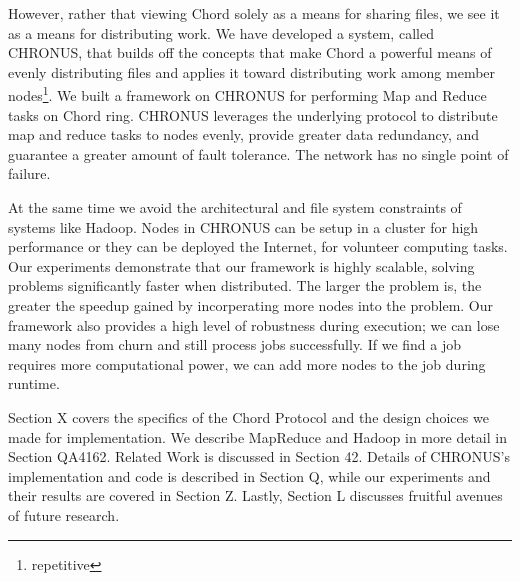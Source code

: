 \documentclass[conference, compsocconf, letterpaper]{IEEEtran}
\begin{document}
However, rather that viewing Chord solely as a means for sharing files, we see it as a means for distributing work.  We have developed a system, called CHRONUS, that builds off the concepts that make Chord a powerful means of evenly distributing files and applies it toward distributing work among member nodes\footnote{repetitive}.  We built a framework on CHRONUS for performing Map and Reduce tasks on Chord ring.  CHRONUS leverages the underlying protocol to distribute map and reduce tasks to nodes evenly, provide greater data redundancy, and guarantee a greater amount of fault tolerance.  The network has no single point of failure.

At the same time we avoid the architectural and file system constraints of systems like Hadoop.  Nodes in CHRONUS can be setup in a cluster for high performance or they can be deployed the Internet, for volunteer computing tasks.  Our experiments demonstrate that our framework is highly scalable, solving problems significantly faster when distributed.  The larger the problem is, the greater the speedup gained by incorperating more nodes into the problem.  Our framework also provides a high level of robustness during execution;  we can lose many nodes from churn and still process jobs successfully.  If we find a job requires more computational power, we can add more nodes to the job  during runtime.


Section X covers the specifics of the Chord Protocol and the design choices we made for implementation. We describe MapReduce and Hadoop in more detail in Section QA4162.  Related Work is discussed in Section 42. Details of CHRONUS's implementation and code is described in Section Q, while our experiments and their results are covered in Section Z.  Lastly, Section L discusses fruitful avenues of future research.


\end{document}

